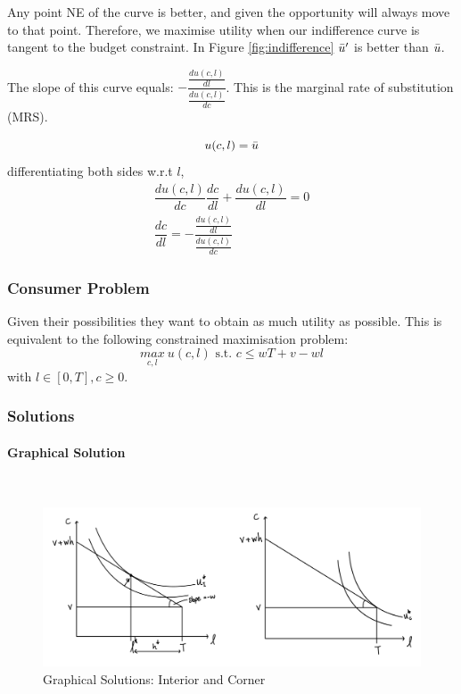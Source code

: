 \documentclass[11pt]{article}
\begin{document}
Any point NE of the curve is better, and given the opportunity will always move to that point. Therefore, we maximise utility when our indifference curve is tangent to the budget constraint. In Figure \ref{fig:indifference} $\Bar{u}^\prime$ is better than $\Bar{u}$.

\begin{note}
    The slope of this curve equals: $-\dfrac{\frac{du(c,l)}{dl}}{\frac{du(c,l)}{dc}}$. This is the marginal rate of substitution (MRS).
\end{note}
\begin{deriv}
\[u(c,l) = \Bar{u}\]
differentiating both sides w.r.t $l$,
\begin{gather*}
    \dfrac{du(c,l)}{dc}\dfrac{dc}{dl} + \dfrac{du(c,l)}{dl} = 0 \\
    \dfrac{dc}{dl} = -\dfrac{\frac{du(c,l)}{dl}}{\frac{du(c,l)}{dc}}
\end{gather*}
\end{deriv}

\subsubsection{Consumer Problem}

Given their possibilities they want to obtain as much utility as possible. This is equivalent to the following constrained maximisation problem:
\[\underset{c,l}{max} \  u(c,l) \text{ s.t. } c\leq wT + v - wl\]
with $l\in [0,T], c\geq0$.

\subsubsection{Solutions}
\paragraph{Graphical Solution} \mbox{} \\

\begin{figure}[h]
    \centering
    \includegraphics[width=15cm]{photos/interior-corner solution.jpeg}
    \caption{Graphical Solutions: Interior and Corner}
    \label{fig:interior corner sol}
\end{figure}
\end{document}
